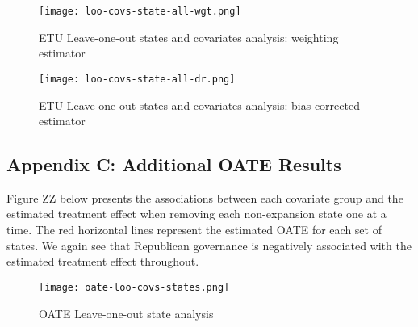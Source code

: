 \documentclass[final]{article}
\begin{document}
\begin{figure}[H]
    \texttt{[image: loo-covs-state-all-wgt.png]}
    \caption{ETU Leave-one-out states and covariates analysis: weighting estimator}
\end{figure}

\begin{figure}[H]
    \texttt{[image: loo-covs-state-all-dr.png]}
    \caption{ETU Leave-one-out states and covariates analysis: bias-corrected estimator}
\end{figure}


\subsection{Appendix C: Additional OATE Results}

Figure ZZ below presents the associations between each covariate group and the estimated treatment effect when removing each non-expansion state one at a time. The red horizontal lines represent the estimated OATE for each set of states. We again see that Republican governance is negatively associated with the estimated treatment effect throughout.

\begin{figure}[H]
    \texttt{[image: oate-loo-covs-states.png]}
    \caption{OATE Leave-one-out state analysis}
\end{figure}
\end{document}
